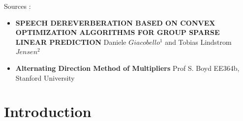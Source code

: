 \documentclass{beamer}
\begin{document}
\begin{frame}{Sources : }
\begin{itemize}
    \item \textbf{SPEECH DEREVERBERATION BASED ON CONVEX OPTIMIZATION ALGORITHMS FOR GROUP SPARSE LINEAR PREDICTION}
\newline
Daniele $Giacobello^1$ and Tobias Lindstrom $Jensen^2$ \newline
\item \textbf{Alternating Direction Method of Multipliers}
\newline
Prof S. Boyd
EE364b, Stanford University
\newline
\end{itemize}
\end{frame}


\section{Introduction}
\end{document}
